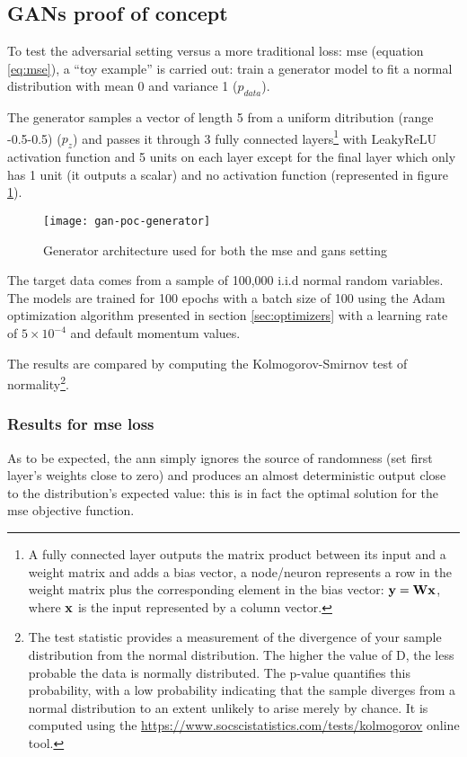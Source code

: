 \documentclass[../main.tex]{subfiles}
\begin{document}
\subsection{GANs proof of concept}
To test the adversarial setting versus a more traditional loss: \gls{mse}
(equation \ref{eq:mse}),
a ``toy example'' is carried out: train a generator
model to fit a normal distribution with mean 0 and variance 1 ($p_{data}$).

The generator samples a vector of length 5
from a uniform ditribution (range -0.5-0.5) ($p_z$) and passes
it through 3 fully connected layers\footnote{A fully connected layer outputs
the matrix product between its input and a weight matrix and adds a bias vector,
a node/neuron represents a row in the weight matrix plus the corresponding
element in the bias vector: $\mathbf{y} = \mathbf{W}\mathbf{x}$, where
$\mathbf{x}$ is the input represented by a column vector.}
with LeakyReLU activation function and 5 units on each layer except for the
final layer which only has 1 unit (it outputs a scalar) and no activation
function (represented in figure \ref{fig:fig:gan-poc-generator}).

\begin{figure}[h]
\centering
\texttt{[image: gan-poc-generator]}
\caption{Generator architecture used for both the \gls{mse} and \gls{gans}
setting}
\label{fig:fig:gan-poc-generator}
\end{figure}

The target data comes from a sample of 100,000 i.i.d normal random
variables.  The models are trained for 100 epochs with a batch size of 100
using the Adam optimization algorithm presented in section \ref{sec:optimizers}
with a learning rate of $5 \times 10^{-4}$ and default momentum values.

The results are compared by computing the Kolmogorov-Smirnov test of
normality\footnote{The test statistic provides a measurement of the divergence
of your sample distribution from the normal distribution.
The higher the value of D, the less probable  the data is normally distributed.
The p-value quantifies this probability, with a low probability indicating that
the sample diverges from a normal distribution to an extent unlikely to arise
merely by chance.  It is computed
using the \url{https://www.socscistatistics.com/tests/kolmogorov} online tool.}.

\subsubsection{Results for \gls{mse} loss}
As to be expected, the \gls{ann} simply ignores the source of randomness
(set first layer's weights close to zero) and produces an almost deterministic
output close to the distribution's expected value: this is in fact the optimal
solution for the \gls{mse} objective function.
\end{document}
